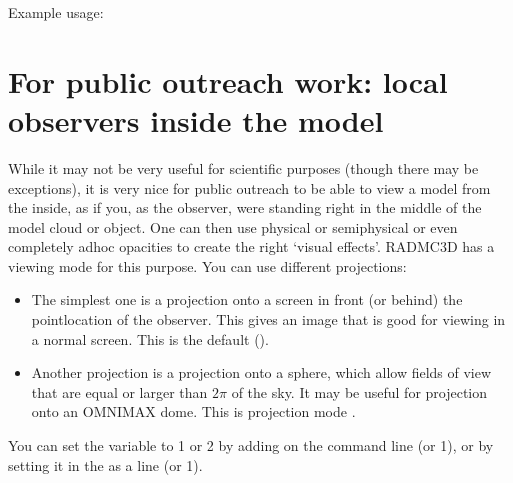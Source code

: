 \documentclass[letterpaper,10pt,english]{sphinxmanual}
\begin{document}
Example usage:

\begin{sphinxVerbatim}[commandchars=\\\{\}]
        
\end{sphinxVerbatim}


\section{For public outreach work: local observers inside the model}
\label{\detokenize{imagesspectra:for-public-outreach-work-local-observers-inside-the-model}}\label{\detokenize{imagesspectra:sec-local-observer}}
While it may not be very useful for scientific purposes (though there may be
exceptions), it is very nice for public outreach to be able to view a model
from the inside, as if you, as the observer, were standing right in the
middle of the model cloud or object. One can then use physical or
semi\sphinxhyphen{}physical or even completely ad\sphinxhyphen{}hoc opacities to create the right
‘visual effects’. RADMC\sphinxhyphen{}3D has a viewing mode for this purpose. You can use
different projections:
\begin{itemize}
\item {} 

The simplest one is a projection onto a screen in front (or behind) the
point\sphinxhyphen{}location of the observer. This gives an image that is good for viewing
in a normal screen. This is the default ().

\item {} 

Another projection is a projection onto a sphere, which allow fields of view
that are equal or larger than \(2\pi\) of the sky. It may be useful for
projection onto an OMNIMAX dome. This is projection mode
.

\end{itemize}

You can set the variable  to 1 or 2 by adding on
the command line  (or 1), or by setting it in the
 as a line  (or 1).
\end{document}
